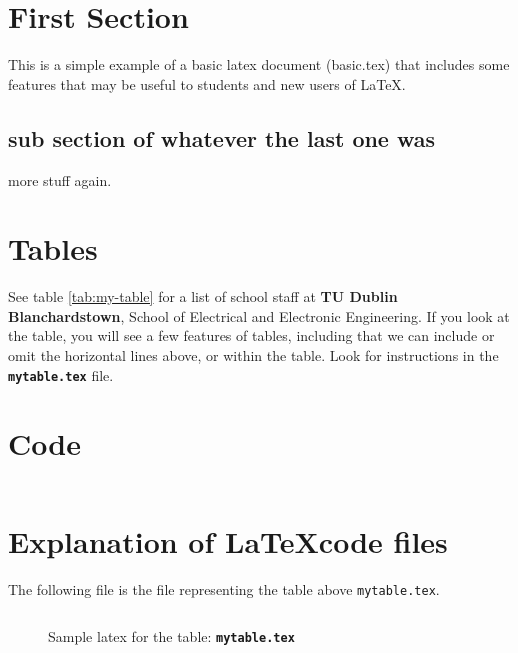 \documentclass{article} %
\begin{document}
\section{First Section} %
This is a simple example of a basic latex document (basic.tex) that includes some features that may be useful to students and new users of \LaTeX. %
\subsection{sub section of whatever the last one was}  %
more stuff again. %

\section{Tables} %
See table \ref{tab:my-table} for a list of school staff at \textbf{TU Dublin Blanchardstown}, School of Electrical and Electronic Engineering. %
If you look at the table, you will see a few features of tables, including that we can include or omit the horizontal lines above, or within the table. Look for \texttt{\textbf{}} instructions in the \textbf{\texttt{mytable.tex}} file.\\

\appendix %

\section{Code} %

\inputminted[breaklines,breakanywhere,linenos]{c}{hello.c} %

\section{Explanation of \LaTeX code files}
The following file is the file representing the table above \texttt{mytable.tex}.
\inputminted[breaklines,breakanywhere,linenos]{latex}{mytable.tex}
\begin{figure}[H]
    \caption{Sample latex for the table: \textbf{\texttt{mytable.tex}}} %
    \label{tab:my-table-code}
\end{figure}
\end{document}
